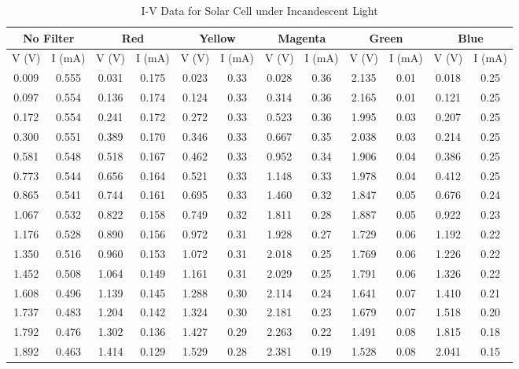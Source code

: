 \begin{table*}
    \centering
    \caption{I-V Data for Solar Cell under Incandescent Light}
    \begin{tabular}{|cc|cc|cc|cc|cc|cc|} \hline
    \multicolumn{2}{|c|}{No Filter} & \multicolumn{2}{c|}{Red} & \multicolumn{2}{c|}{Yellow} & \multicolumn{2}{c|}{Magenta} & \multicolumn{2}{c|}{Green} & \multicolumn{2}{c|}{Blue} \\ \hline
    V (V) & I (mA) & V (V) & I (mA) & V (V) & I (mA) & V (V) & I (mA) & V (V) & I (mA) & V (V) & I (mA) \\ \hline
    0.009 & 0.555 & 0.031 & 0.175 & 0.023 & 0.33 & 0.028 & 0.36 & 2.135 & 0.01 & 0.018 & 0.25 \\
    0.097 & 0.554 & 0.136 & 0.174 & 0.124 & 0.33 & 0.314 & 0.36 & 2.165 & 0.01 & 0.121 & 0.25 \\
    0.172 & 0.554 & 0.241 & 0.172 & 0.272 & 0.33 & 0.523 & 0.36 & 1.995 & 0.03 & 0.207 & 0.25 \\
    0.300 & 0.551 & 0.389 & 0.170 & 0.346 & 0.33 & 0.667 & 0.35 & 2.038 & 0.03 & 0.214 & 0.25 \\
    0.581 & 0.548 & 0.518 & 0.167 & 0.462 & 0.33 & 0.952 & 0.34 & 1.906 & 0.04 & 0.386 & 0.25 \\
    0.773 & 0.544 & 0.656 & 0.164 & 0.521 & 0.33 & 1.148 & 0.33 & 1.978 & 0.04 & 0.412 & 0.25 \\
    0.865 & 0.541 & 0.744 & 0.161 & 0.695 & 0.33 & 1.460 & 0.32 & 1.847 & 0.05 & 0.676 & 0.24 \\
    1.067 & 0.532 & 0.822 & 0.158 & 0.749 & 0.32 & 1.811 & 0.28 & 1.887 & 0.05 & 0.922 & 0.23 \\
    1.176 & 0.528 & 0.890 & 0.156 & 0.972 & 0.31 & 1.928 & 0.27 & 1.729 & 0.06 & 1.192 & 0.22 \\
    1.350 & 0.516 & 0.960 & 0.153 & 1.072 & 0.31 & 2.018 & 0.25 & 1.769 & 0.06 & 1.226 & 0.22 \\
    1.452 & 0.508 & 1.064 & 0.149 & 1.161 & 0.31 & 2.029 & 0.25 & 1.791 & 0.06 & 1.326 & 0.22 \\
    1.608 & 0.496 & 1.139 & 0.145 & 1.288 & 0.30 & 2.114 & 0.24 & 1.641 & 0.07 & 1.410 & 0.21 \\
    1.737 & 0.483 & 1.204 & 0.142 & 1.324 & 0.30 & 2.181 & 0.23 & 1.679 & 0.07 & 1.518 & 0.20 \\
    1.792 & 0.476 & 1.302 & 0.136 & 1.427 & 0.29 & 2.263 & 0.22 & 1.491 & 0.08 & 1.815 & 0.18 \\
    1.892 & 0.463 & 1.414 & 0.129 & 1.529 & 0.28 & 2.381 & 0.19 & 1.528 & 0.08 & 2.041 & 0.15 \\

\end{tabular}
\end{table*}
